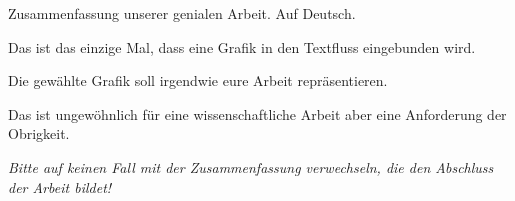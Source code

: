 Zusammenfassung unserer genialen Arbeit. Auf Deutsch.

Das ist das einzige Mal, dass eine Grafik in den Textfluss eingebunden wird.

Die gewählte Grafik soll irgendwie eure Arbeit repräsentieren.

Das ist ungewöhnlich für eine wissenschaftliche Arbeit aber eine Anforderung der Obrigkeit.

\emph{Bitte auf keinen Fall mit der Zusammenfassung verwechseln, die den Abschluss der Arbeit bildet!}

\lipsum[6]
